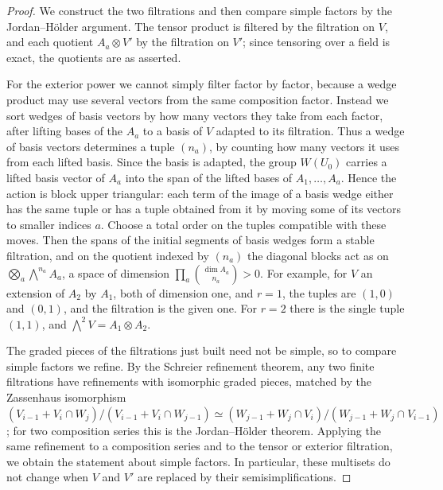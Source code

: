 \documentclass[11pt]{article}
\begin{document}
\begin{proof}[{Proof}]\label{bp41}%
We construct the two filtrations and then compare simple factors by the Jordan–Hölder argument. The tensor product is filtered by the filtration on \(V\), and each quotient \(A_a\otimes V'\) by the filtration on \(V'\); since tensoring over a field is exact, the quotients are as asserted.

For the exterior power we cannot simply filter factor by factor, because a wedge product may use several vectors from the same composition factor. Instead we sort wedges of basis vectors by how many vectors they take from each factor, after lifting bases of the \(A_a\) to a basis of \(V\) adapted to its filtration. Thus a wedge of basis vectors determines a tuple \((n_a)\), by counting how many vectors it uses from each lifted basis. Since the basis is adapted, the group \(W(U_0)\) carries a lifted basis vector of \(A_a\) into the span of the lifted bases of \(A_1,\ldots,A_a\). Hence the action is block upper triangular: each term of the image of a basis wedge either has the same tuple or has a tuple obtained from it by moving some of its vectors to smaller indices \(a\). Choose a total order on the tuples compatible with these moves. Then the spans of the initial segments of basis wedges form a stable filtration, and on the quotient indexed by \((n_a)\) the diagonal blocks act as on \(\bigotimes_a\bigwedge^{n_a}A_a\), a space of dimension \(\prod_a\binom{\dim A_a}{n_a}>0\). For example, for \(V\) an extension of \(A_2\) by \(A_1\), both of dimension one, and \(r=1\), the tuples are \((1,0)\) and \((0,1)\), and the filtration is the given one. For \(r=2\) there is the single tuple \((1,1)\), and \(\bigwedge^2V=A_1\otimes A_2\).

The graded pieces of the filtrations just built need not be simple, so to compare simple factors we refine. By the Schreier refinement theorem, any two finite filtrations have refinements with isomorphic graded pieces, matched by the Zassenhaus isomorphism \((V_{i-1}+V_i\cap W_j)/(V_{i-1}+V_i\cap W_{j-1})\simeq
(W_{j-1}+W_j\cap V_i)/(W_{j-1}+W_j\cap V_{i-1})\); for two composition series this is the Jordan–Hölder theorem. Applying the same refinement to a composition series and to the tensor or exterior filtration, we obtain the statement about simple factors. In particular, these multisets do not change when \(V\) and \(V'\) are replaced by their semisimplifications.
\end{proof}
\end{document}
